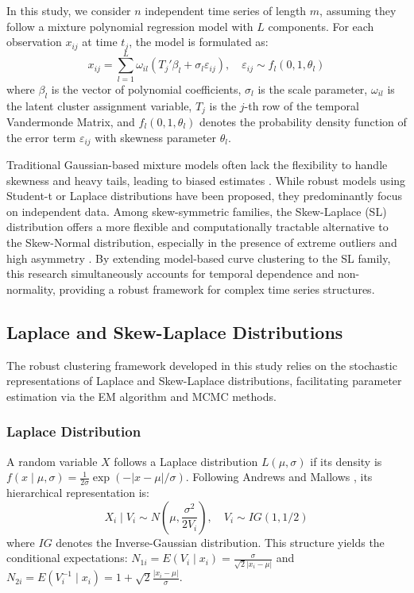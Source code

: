 \documentclass[twoside]{article}
\begin{document}
In this study, we consider $n$ independent time series of length $m$, assuming they follow a mixture polynomial regression model with $L$ components. For each observation $x_{ij}$ at time $t_j$, the model is formulated as:
\begin{equation}
x_{ij} = \sum_{l=1}^{L} \omega_{il} (T_j' \beta_l + \sigma_l \varepsilon_{ij}), \quad \varepsilon_{ij} \sim f_l(0, 1, \theta_l)
\end{equation}
where $\beta_l$ is the vector of polynomial coefficients, $\sigma_l$ is the scale parameter, $\omega_{il}$ is the latent cluster assignment variable, $T_j$ is the $j$-th row of the temporal Vandermonde Matrix, and $f_l(0, 1, \theta_l)$ denotes the probability density function of the error term $\varepsilon_{ij}$ with skewness parameter $\theta_l$.

Traditional Gaussian-based mixture models often lack the flexibility to handle skewness and heavy tails, leading to biased estimates \citep{lee2013a}. While robust models using Student-t or Laplace distributions have been proposed, they predominantly focus on independent data. Among skew-symmetric families, the Skew-Laplace (SL) distribution offers a more flexible and computationally tractable alternative to the Skew-Normal distribution, especially in the presence of extreme outliers and high asymmetry \cite{arslan2009}. By extending model-based curve clustering to the SL family, this research simultaneously accounts for temporal dependence and non-normality, providing a robust framework for complex time series structures.

\subsection{Laplace and Skew-Laplace Distributions}

The robust clustering framework developed in this study relies on the stochastic representations of Laplace and Skew-Laplace distributions, facilitating parameter estimation via the EM algorithm and MCMC methods.

\subsubsection{Laplace Distribution}
A random variable $X$ follows a Laplace distribution $L(\mu, \sigma)$ if its density is $f(x \mid \mu, \sigma) = \frac{1}{2\sigma} \exp(-|x-\mu|/\sigma)$. Following Andrews and Mallows \citep{andrews1974}, its hierarchical representation is:
\begin{equation}\label{eq6}
X_i \mid V_i \sim N\left(\mu, \frac{\sigma^2}{2V_i}\right), \quad V_i \sim IG(1, 1/2)
\end{equation}
where $IG$ denotes the Inverse-Gaussian distribution. This structure yields the conditional expectations:
$N_{1i} = E(V_i \mid x_i) = \frac{\sigma}{\sqrt{2}|x_i-\mu|}$ and $N_{2i} = E(V_i^{-1} \mid x_i) = 1 + \sqrt{2}\frac{|x_i-\mu|}{\sigma}$.
\end{document}
